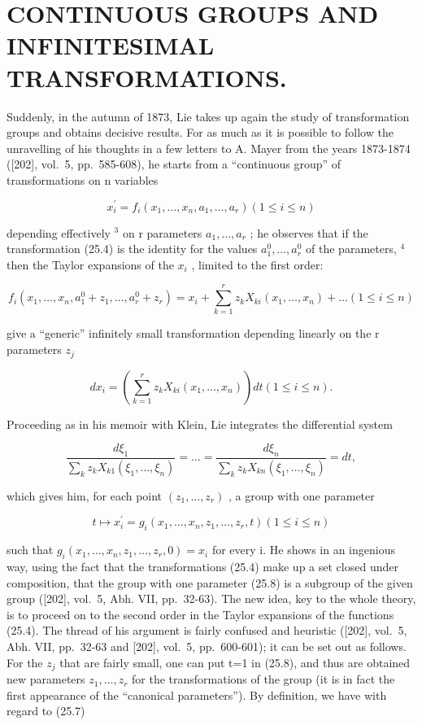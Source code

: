 \section{CONTINUOUS GROUPS AND INFINITESIMAL TRANSFORMATIONS.}

Suddenly, in the autumn of 1873, Lie takes up again the study of transformation groups and obtains decisive results. For as much as it is possible to follow the unravelling of his thoughts in a few letters to A. Mayer from the years 1873-1874 ({[}202{]}, vol.~5, pp.~585-608), he starts from a ``continuous group'' of transformations on n variables

\[
x _ {i} ^ {\prime} = f _ {i} (x _ {1}, \dots , x _ {n}, a _ {1}, \dots , a _ {r}) (1 \leq i \leq n)\tag{25.4}
\]

depending effectively \(^{3}\) on r parameters \(a_{1},\ldots,a_{r}\) ; he observes that if the transformation (25.4) is the identity for the values \(a_{1}^{0},\ldots,a_{r}^{0}\) of the parameters, \(^{4}\) then the Taylor expansions of the \(x_{i}\) , limited to the first order:

\[
f _ {i} \left(x _ {1}, \dots , x _ {n}, a _ {1} ^ {0} + z _ {1}, \dots , a _ {r} ^ {0} + z _ {r}\right) = x _ {i} + \sum_ {k = 1} ^ {r} z _ {k} X _ {k i} \left(x _ {1}, \dots , x _ {n}\right) + \dots (1 \leq i \leq n)\tag{25.5}
\]

give a ``generic'' infinitely small transformation depending linearly on the r parameters \(z_{j}\)

\[
d x _ {i} = \left(\sum_ {k = 1} ^ {r} z _ {k} X _ {k i} (x _ {1}, \dots , x _ {n})\right) d t (1 \leq i \leq n).\tag{25.6}
\]

Proceeding as in his memoir with Klein, Lie integrates the differential system

\[
\frac {d \xi_ {1}}{\sum_ {k} z _ {k} X _ {k 1} (\xi_ {1} , \dots , \xi_ {n})} = \dots = \frac {d \xi_ {n}}{\sum_ {k} z _ {k} X _ {k n} (\xi_ {1} , \dots , \xi_ {n})} = d t,\tag{25.7}
\]

which gives him, for each point \((z_{1},\ldots,z_{r})\) , a group with one parameter

\[
t \mapsto x _ {i} ^ {\prime} = g _ {i} (x _ {1}, \dots , x _ {n}, z _ {1}, \dots , z _ {r}, t) (1 \leq i \leq n)\tag{25.8}
\]

such that \(g_{i}(x_{1},\ldots,x_{n},z_{1},\ldots,z_{r},0)=x_{i}\) for every i. He shows in an ingenious way, using the fact that the transformations (25.4) make up a set closed under composition, that the group with one parameter (25.8) is a subgroup of the given group ({[}202{]}, vol.~5, Abh. VII, pp.~32-63). The new idea, key to the whole theory, is to proceed on to the second order in the Taylor expansions of the functions (25.4). The thread of his argument is fairly confused and heuristic ({[}202{]}, vol.~5, Abh. VII, pp.~32-63 and {[}202{]}, vol.~5, pp.~600-601); it can be set out as follows. For the \(z_{j}\) that are fairly small, one can put t=1 in (25.8), and thus are obtained new parameters \(z_{1},\ldots,z_{r}\) for the transformations of the group (it is in fact the first appearance of the ``canonical parameters''). By definition, we have with regard to (25.7)


